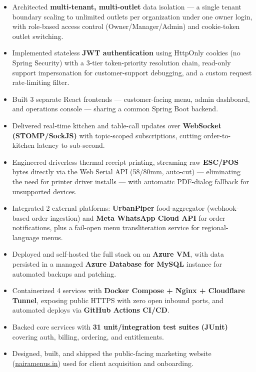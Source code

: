 \documentclass[10pt]{article}
\begin{document}
\begin{itemize}[leftmargin=*, itemsep=2pt]
\item Architected \textbf{multi-tenant, multi-outlet} data isolation — a single tenant boundary scaling to unlimited outlets per organization under one owner login, with role-based access control (Owner/Manager/Admin) and cookie-token outlet switching.
\item Implemented stateless \textbf{JWT authentication} using HttpOnly cookies (no Spring Security) with a 3-tier token-priority resolution chain, read-only support impersonation for customer-support debugging, and a custom request rate-limiting filter.
\item Built 3 separate React frontends — customer-facing menu, admin dashboard, and operations console — sharing a common Spring Boot backend.
\item Delivered real-time kitchen and table-call updates over \textbf{WebSocket (STOMP/SockJS)} with topic-scoped subscriptions, cutting order-to-kitchen latency to sub-second.
\item Engineered driverless thermal receipt printing, streaming raw \textbf{ESC/POS} bytes directly via the Web Serial API (58/80mm, auto-cut) — eliminating the need for printer driver installs — with automatic PDF-dialog fallback for unsupported devices.
\item Integrated 2 external platforms: \textbf{UrbanPiper} food-aggregator (webhook-based order ingestion) and \textbf{Meta WhatsApp Cloud API} for order notifications, plus a fail-open menu transliteration service for regional-language menus.
\item Deployed and self-hosted the full stack on an \textbf{Azure VM}, with data persisted in a managed \textbf{Azure Database for MySQL} instance for automated backups and patching.
\item Containerized 4 services with \textbf{Docker Compose + Nginx + Cloudflare Tunnel}, exposing public HTTPS with zero open inbound ports, and automated deploys via \textbf{GitHub Actions CI/CD}.
\item Backed core services with \textbf{31 unit/integration test suites (JUnit)} covering auth, billing, ordering, and entitlements.
\item Designed, built, and shipped the public-facing marketing website (\href{https://nairamenus.in}{nairamenus.in}) used for client acquisition and onboarding.
\end{itemize}

\vspace{3pt}
\end{document}
